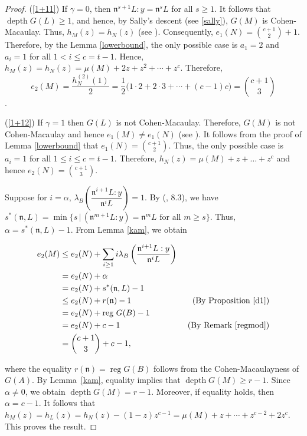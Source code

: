 \documentclass[11pt]{amsart}
\theoremstyle{plain}
\newcommand{\n}{\mathfrak{n}}
\theoremstyle{plain}
\begin{document}
\begin{proof}

  (\ref{1+11}) If $\gamma=0$, then $\mathfrak{n}^{s+1}L:y=\mathfrak{n}^sL$ for all $s\geq1$. It follows that $\operatorname{depth}G(L)\geq1$, and hence, by Sally's descent (see \ref{sally}), $G(M)$ is Cohen-Macaulay. Thus, $h_M(z)=h_N(z)$ (see \cite[Theorem 8, Corollary 11]{HCCMM}). Consequently, $e_1(N)=\binom{c+1}{2}+1$. Therefore, by the Lemma \ref{lowerbound}, the only possible case is $a_1=2$ and $a_i=1$ for all $1<i\leq c=t-1$. Hence, $h_M(z)=h_N(z)=\mu(M)+2z+z^2+\cdots+z^c$. Therefore, $$e_2(M)=\frac{h_N^{(2)}(1)}{2}=\frac{1}{2}\big(1\cdot2+2\cdot3+\cdots+(c-1)c\big)=\binom{c+1}{3}$$.

\noindent
  (\ref{1+12}) If $\gamma= 1$ then $G(L)$ is not Cohen-Macaulay. Therefore, $G(M)$ is not Cohen-Macaulay and hence $e_1(M)\neq e_1(N)$ (see \cite[Corollary 10]{HCCMM}). It follows from the proof of Lemma \ref{lowerbound} that $e_1(N)=\binom{c+1}{2}.$ Thus, the only possible case is $a_i=1$ for all $1\leq i\leq c=t-1.$ Therefore, $h_N(z)=\mu(M)+z+\ldots+ z^{c}$ and hence $e_2(N)=\binom{c+1}{3}.$

Suppose for $i=\alpha$, $\lambda_B \left(\dfrac{\n^{i+1}L:y}{\n^iL}\right)=1.$ By (\cite{Zulfeqarr}, 8.3), we have $s^*(\n,L)=\min\{s\,|\,(\n^{m+1}L:y)=\n^mL \text{ for all }m\geq s\}.$ Thus, $\alpha=s^*(\n,L)-1.$
From Lemma \ref{kam}, we obtain


\begin{align*}
      e_2(M) & \leq e_2(N) + \sum_{i\geq 1}i\lambda_B\left(\frac{{\n}^{i+1}L:y}{{\n}^iL}\right)\\ & = e_2(N) + \alpha \\ & =e_2(N)+s^*(\n,L)-1 \\ & \leq e_2(N)+r(\n)-1 & \text{ (By Proposition \ref{d1})} \\ & = e_2(N)+ \text{reg }G(B)-1 \\& = e_2(N)+ c-1 & \text{ (By Remark \ref{regmod})}\\ &= \binom{c+1}{3}+c-1,
\end{align*}


where the equality $r(\mathfrak{n})=\operatorname{reg} G(B)$ follows from the Cohen-Macaulayness of $G(A)$. By Lemma~\ref{kam}, equality implies that $\operatorname{depth}G(M)\geq r-1$. Since $\alpha\neq0$, we obtain $\operatorname{depth}G(M)=r-1$. Moreover, if equality holds, then $\alpha=c-1$. It follows that
$h_M(z)=h_L(z)=h_N(z)-(1-z)z^{c-1}
=\mu(M)+z+\cdots+z^{c-2}+2z^c$.
This proves the result.
\end{proof}
\end{document}
